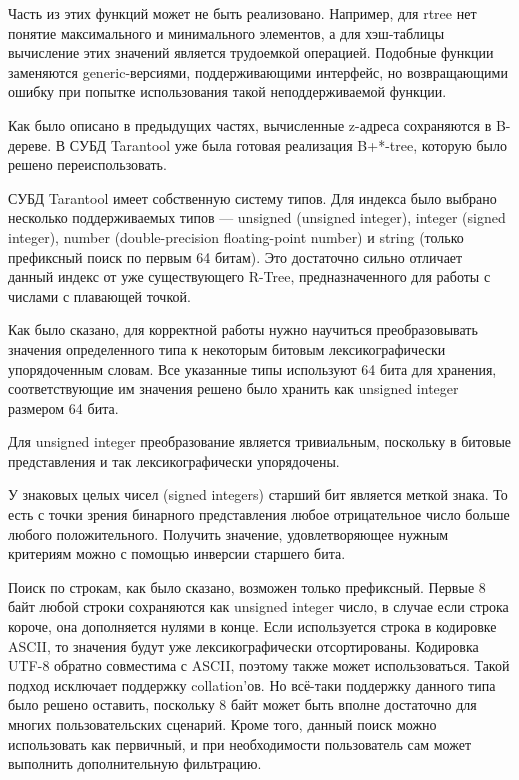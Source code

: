 Часть из этих функций может не быть реализовано.
Например, для rtree нет понятие максимального и минимального элементов,
а для хэш-таблицы вычисление этих значений является трудоемкой операцией.
Подобные функции заменяются generic-версиями,
поддерживающими интерфейс, но возвращающими ошибку
при попытке использования такой неподдерживаемой функции.

Как было описано в предыдущих частях, вычисленные z-адреса сохраняются в B-дереве. В СУБД Tarantool уже была готовая реализация B+*-tree, которую было решено переиспользовать.

СУБД Tarantool имеет собственную систему типов. Для индекса было выбрано несколько поддерживаемых типов --- unsigned (unsigned integer), integer (signed integer), number (double-precision floating-point number) и string (только префиксный поиск по первым 64 битам). Это достаточно сильно отличает данный индекс от уже существующего R-Tree, предназначенного для работы с числами с плавающей точкой.

Как было сказано, для корректной работы нужно научиться преобразовывать значения определенного типа к некоторым битовым лексикографически упорядоченным словам. Все указанные типы используют 64 бита для хранения, соответствующие им значения решено было хранить как unsigned integer размером 64 бита. 

Для unsigned integer преобразование является тривиальным, поскольку в битовые представления и так лексикографически упорядочены. 

У знаковых целых чисел (signed integers) старший бит является меткой знака. То есть с точки зрения бинарного представления любое отрицательное число больше любого положительного. Получить значение, удовлетворяющее нужным критериям можно с помощью инверсии старшего бита.

Поиск по строкам, как было сказано, возможен только префиксный. Первые 8 байт любой строки сохраняются как unsigned integer число, в случае если строка короче, она дополняется нулями в конце. Если используется строка в кодировке ASCII, то значения будут уже лексикографически отсортированы. Кодировка UTF-8 обратно совместима с ASCII, поэтому также может использоваться. Такой подход исключает поддержку collation’ов. Но всё-таки поддержку данного типа было решено оставить, поскольку 8 байт может быть вполне достаточно для многих пользовательских сценарий. Кроме того, данный поиск можно использовать как первичный, и при необходимости пользователь сам может выполнить дополнительную фильтрацию.

